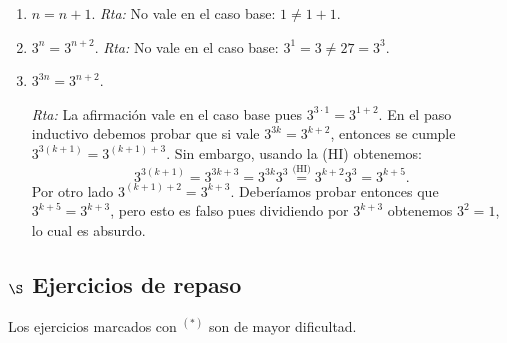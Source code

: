 \documentclass[a4paper,12pt,twoside,spanish,reqno]{amsbook}
\numberwithin{equation}{section}
\newcommand{\rta}{\noindent\textit{Rta: }}
\begin{document}
\begin{enumerate}
\begin{enumerate}
                \item  $n=n+1$. \rta No vale en el caso base: $1 \ne 1+1$.
                \item  $3^n = 3^{n+2}$.  \rta No vale en el caso base: $3^1 = 3 \ne 27 = 3^3$.
                \item  $3^{3n} = 3^{n+2}$.  
                
                \rta La afirmación vale en el caso base pues  $3^{3\cdot 1} = 3^{1+2}$. En el paso inductivo debemos probar que si  vale $3^{3k} = 3^{k+2}$, entonces se cumple $3^{3(k+1)} = 3^{(k+1)+3}$. Sin embargo, usando  la (HI) obtenemos:
                \begin{equation*}
                3^{3(k+1)}  = 3^{3k+3} = 3^{3k}3^3\overset{\text{(HI)}}{=} 3^{k+2}3^3 = 3^{k+5}.
                \end{equation*}
                Por otro  lado $3^{(k+1)+2} = 3^{k+3}$. Deberíamos probar entonces que $3^{k+5} = 3^{k+3}$, pero esto es falso pues dividiendo  por $3^{k+3}$ obtenemos $3^2 =1$,  lo cual es absurdo.
        \end{enumerate}
        
        
        


        \end{enumerate}

        \subsection*{$\S$ Ejercicios de repaso} Los ejercicios marcados con ${}^{(*)}$ son de mayor dificultad.
        
\end{document}
